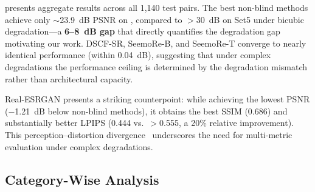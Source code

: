 \begin{table}[t]
\centering
\caption{\textbf{Overall performance on \dataset ($\times$4).}
Non-blind methods cluster in distortion metrics; the blind method (Real-ESRGAN) achieves lower PSNR but substantially better perceptual quality.}
\label{tab:overall_results}
\end{table}

 presents aggregate results across all 1{,}140 test pairs.
The best non-blind methods achieve only ${\sim}$23.9~dB PSNR on \dataset, compared to ${>}$30~dB on Set5 under bicubic degradation---a \textbf{6--8~dB gap} that directly quantifies the degradation gap motivating our work.
DSCF-SR, SeemoRe-B, and SeemoRe-T converge to nearly identical performance (within 0.04~dB), suggesting that under complex degradations the performance ceiling is determined by the degradation mismatch rather than architectural capacity.

Real-ESRGAN presents a striking counterpoint: while achieving the lowest PSNR ($-$1.21~dB below non-blind methods), it obtains the best SSIM (0.686) and substantially better LPIPS (0.444 vs.\ ${>}$0.555, a 20\% relative improvement).
This perception--distortion divergence~\cite{blau2018perception} underscores the need for multi-metric evaluation under complex degradations.

\subsection{Category-Wise Analysis}
\label{sec:exp_category}

